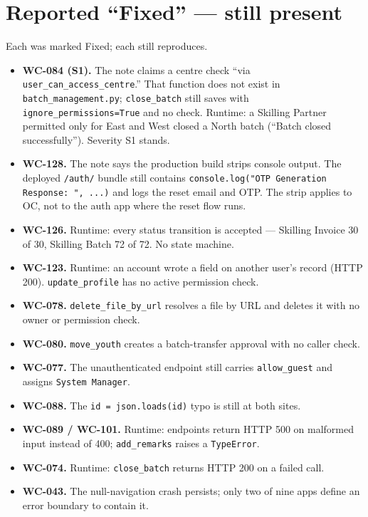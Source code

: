\documentclass[11pt]{article}
\newcommand{\wc}[1]{\mbox{WC-#1}}
\begin{document}
\section{Reported ``Fixed'' --- still present}
Each was marked Fixed; each still reproduces.
\begin{itemize}
  \item \textbf{\wc{084} (S1).} The note claims a centre check ``via \texttt{user\_can\_access\_centre}.''
        That function does not exist in \texttt{batch\_management.py}; \texttt{close\_batch} still saves
        with \texttt{ignore\_permissions=True} and no check. Runtime: a Skilling Partner permitted only
        for East and West closed a North batch (``Batch closed successfully''). Severity S1 stands.
  \item \textbf{\wc{128}.} The note says the production build strips console output. The deployed
        \texttt{/auth/} bundle still contains \texttt{console.log("OTP Generation Response: ", ...)} and
        logs the reset email and OTP. The strip applies to OC, not to the auth app where the reset flow runs.
  \item \textbf{\wc{126}.} Runtime: every status transition is accepted --- Skilling Invoice 30 of 30,
        Skilling Batch 72 of 72. No state machine.
  \item \textbf{\wc{123}.} Runtime: an account wrote a field on another user's record (HTTP 200).
        \texttt{update\_profile} has no active permission check.
  \item \textbf{\wc{078}.} \texttt{delete\_file\_by\_url} resolves a file by URL and deletes it with no
        owner or permission check.
  \item \textbf{\wc{080}.} \texttt{move\_youth} creates a batch-transfer approval with no caller check.
  \item \textbf{\wc{077}.} The unauthenticated endpoint still carries \texttt{allow\_guest} and assigns
        \texttt{System Manager}.
  \item \textbf{\wc{088}.} The \texttt{id = json.loads(id)} typo is still at both sites.
  \item \textbf{\wc{089} / \wc{101}.} Runtime: endpoints return HTTP 500 on malformed input instead of
        400; \texttt{add\_remarks} raises a \texttt{TypeError}.
  \item \textbf{\wc{074}.} Runtime: \texttt{close\_batch} returns HTTP 200 on a failed call.
  \item \textbf{\wc{043}.} The null-navigation crash persists; only two of nine apps define an error
        boundary to contain it.
\end{itemize}
\end{document}
